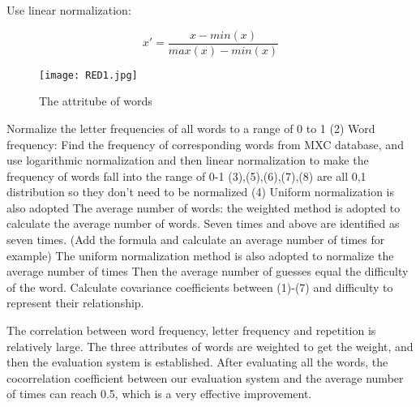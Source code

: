 \documentclass[12pt]{article}  %
\begin{document}
Use linear normalization:

\begin{equation}
	x' = \frac{x-min(x)}{max(x)-min(x)}
\end{equation}

\begin{figure}[htbp]
	\centering
	\texttt{[image: RED1.jpg]}
	\caption{ The attritube of words}\label{fig:result}
\end{figure}



Normalize the letter frequencies of all words to a range of 0 to 1
(2) Word frequency: Find the frequency of corresponding words from MXC database, and use logarithmic normalization and then linear normalization to make the frequency of words fall into the range of 0-1
(3),(5),(6),(7),(8) are all 0,1 distribution so they don't need to be normalized
(4) Uniform normalization is also adopted
The average number of words: the weighted method is adopted to calculate the average number of words. Seven times and above are identified as seven times. (Add the formula and calculate an average number of times for example) The uniform normalization method is also adopted to normalize the average number of times
Then the average number of guesses equal the difficulty of the word.
Calculate covariance coefficients between (1)-(7) and difficulty to represent their relationship.



The correlation between word frequency, letter frequency and repetition is relatively large. The three attributes of words are weighted to get the weight, and then the evaluation system is established. After evaluating all the words, the cocorrelation coefficient between our evaluation system and the average number of times can reach 0.5, which is a very effective improvement.
\end{document}
